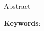 \pagestyle{plain}

\begin{center}
{\LARGE Abstract}\\[1cm]
\end{center}

\noindent
\textbf{Keywords}: